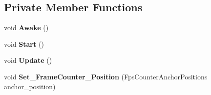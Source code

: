 \subsection*{Private Member Functions}
\begin{DoxyCompactItemize}
\item 
\mbox{\label{class_t_m_pro_1_1_examples_1_1_t_m_p___frame_rate_counter_acf5f19371f84e3401672373517defdd1}} 
void {\bfseries Awake} ()
\item 
\mbox{\label{class_t_m_pro_1_1_examples_1_1_t_m_p___frame_rate_counter_a9707b690b721e835d78734de69177079}} 
void {\bfseries Start} ()
\item 
\mbox{\label{class_t_m_pro_1_1_examples_1_1_t_m_p___frame_rate_counter_a6a307d8f5eb11cb855a5e9823159d6bd}} 
void {\bfseries Update} ()
\item 
\mbox{\label{class_t_m_pro_1_1_examples_1_1_t_m_p___frame_rate_counter_ac5e4979da5b5514cb8c231d815670cae}} 
void {\bfseries Set\+\_\+\+Frame\+Counter\+\_\+\+Position} (Fps\+Counter\+Anchor\+Positions anchor\+\_\+position)
\end{DoxyCompactItemize}
